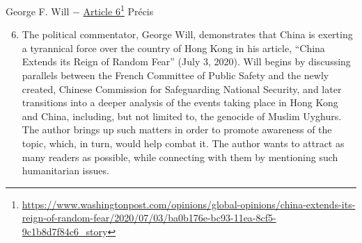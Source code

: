 \documentclass[12pt]{article}
\begin{document}
\begin{center}
George F. Will $-$ \href{https://www.washingtonpost.com/opinions/global-opinions/china-extends-its-reign-of-random-fear/2020/07/03/ba0b176e-bc93-11ea-8cf5-9c1b8d7f84c6_story}{Article 6}\footnote{\url{https://www.washingtonpost.com/opinions/global-opinions/china-extends-its-reign-of-random-fear/2020/07/03/ba0b176e-bc93-11ea-8cf5-9c1b8d7f84c6_story}} Pr\'ecis
\end{center}
\begin{justify}
\begin{enumerate}
    \setcounter{enumi}{5}

  \item The political commentator, George Will, demonstrates that China is exerting a tyrannical force over the country of Hong Kong in his article, ``China Extends its Reign of Random Fear'' (July 3, 2020). Will begins by discussing parallels between the French Committee of Public Safety and the newly created, Chinese Commission for Safeguarding National Security, and later transitions into a deeper analysis of the events taking place in Hong Kong and China, including, but not limited to, the genocide of Muslim Uyghurs. The author brings up such matters in order to promote awareness of the topic, which, in turn, would help combat it. The author wants to attract as many readers as possible, while connecting with them by mentioning such humanitarian issues.

\end{enumerate}
\end{justify}
\end{document}
